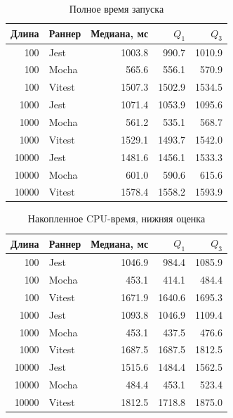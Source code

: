 \begin{table}[H]\centering\small
\caption{Полное время запуска}
\begin{tabular}{rlrrr}\toprule
Длина & Раннер & Медиана, мс & $Q_1$ & $Q_3$\\\midrule
100 & Jest & 1003.8 & 990.7 & 1010.9\\
100 & Mocha & 565.6 & 556.1 & 570.9\\
100 & Vitest & 1507.3 & 1502.9 & 1534.5\\
1000 & Jest & 1071.4 & 1053.9 & 1095.6\\
1000 & Mocha & 561.2 & 535.1 & 568.7\\
1000 & Vitest & 1529.1 & 1493.7 & 1542.0\\
10000 & Jest & 1481.6 & 1456.1 & 1533.3\\
10000 & Mocha & 601.0 & 590.6 & 615.6\\
10000 & Vitest & 1578.4 & 1558.2 & 1593.9\\
\bottomrule\end{tabular}\end{table}

\begin{table}[H]\centering\small
\caption{Накопленное CPU-время, нижняя оценка}
\begin{tabular}{rlrrr}\toprule
Длина & Раннер & Медиана, мс & $Q_1$ & $Q_3$\\\midrule
100 & Jest & 1046.9 & 984.4 & 1085.9\\
100 & Mocha & 453.1 & 414.1 & 484.4\\
100 & Vitest & 1671.9 & 1640.6 & 1695.3\\
1000 & Jest & 1093.8 & 1046.9 & 1109.4\\
1000 & Mocha & 453.1 & 437.5 & 476.6\\
1000 & Vitest & 1687.5 & 1687.5 & 1812.5\\
10000 & Jest & 1515.6 & 1484.4 & 1562.5\\
10000 & Mocha & 484.4 & 453.1 & 523.4\\
10000 & Vitest & 1812.5 & 1718.8 & 1875.0\\
\bottomrule\end{tabular}\end{table}

